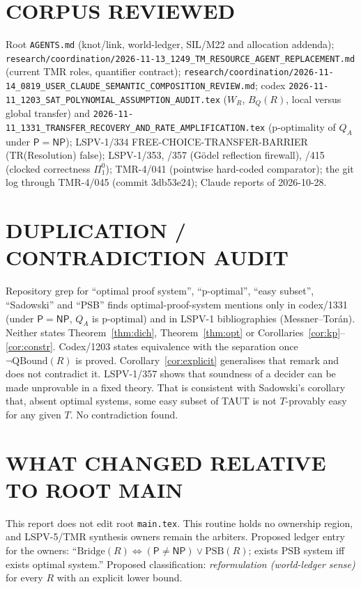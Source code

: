 \documentclass[11pt]{article}
\theoremstyle{definition}
\newcommand{\Pc}{\mathsf{P}}
\newcommand{\NP}{\mathsf{NP}}
\newcommand{\PSB}{\mathrm{PSB}}
\newcommand{\Bridge}{\mathrm{Bridge}}
\begin{document}
\section*{CORPUS REVIEWED}
Root \texttt{AGENTS.md} (knot/link, world-ledger, SIL/M22 and allocation
addenda); \texttt{research/coordination/2026-11-13\_1249\_TM\_RESOURCE\_AGENT\_REPLACEMENT.md}
(current TMR roles, quantifier contract);
\texttt{research/coordination/2026-11-14\_0819\_USER\_CLAUDE\_SEMANTIC\_COMPOSITION\_REVIEW.md};
codex \texttt{2026-11-11\_1203\_SAT\_POLYNOMIAL\_ASSUMPTION\_AUDIT.tex}
($W_R$, $B_Q(R)$, local versus global transfer) and
\texttt{2026-11-11\_1331\_TRANSFER\_RECOVERY\_AND\_RATE\_AMPLIFICATION.tex}
(p-optimality of $Q_A$ under $\Pc=\NP$); LSPV-1/334 FREE-CHOICE-TRANSFER-BARRIER
(TR(Resolution) false); LSPV-1/353, /357 (Gödel reflection firewall), /415
(clocked correctness $\Pi^0_1$); TMR-4/041 (pointwise hard-coded comparator);
the git log through TMR-4/045 (commit 3db53e24); Claude reports of 2026-10-28.

\section*{DUPLICATION / CONTRADICTION AUDIT}
Repository grep for ``optimal proof system'', ``p-optimal'', ``easy subset'',
``Sadowski'' and ``PSB'' finds optimal-proof-system mentions only in codex/1331
(under $\Pc=\NP$, $Q_A$ is p-optimal) and in LSPV-1 bibliographies
(Messner--Torán). Neither states Theorem~\ref{thm:dich},
Theorem~\ref{thm:opt} or Corollaries~\ref{cor:kp}--\ref{cor:constr}.
Codex/1203 states equivalence with the separation once
$\neg\mathrm{QBound}(R)$ is proved. Corollary~\ref{cor:explicit} generalises
that remark and does not contradict it. LSPV-1/357 shows that soundness of a
decider can be made unprovable in a fixed theory. That is consistent with
Sadowski's corollary that, absent optimal systems, some easy subset of TAUT is
not $T$-provably easy for any given $T$. No contradiction found.

\section*{WHAT CHANGED RELATIVE TO ROOT MAIN}
This report does not edit root \texttt{main.tex}. This routine holds no
ownership region, and LSPV-5/TMR synthesis owners remain the arbiters. Proposed
ledger entry for the owners: ``$\Bridge(R)\iff(\Pc\ne\NP)\vee\PSB(R)$; exists
$\PSB$ system iff exists optimal system.'' Proposed classification:
\emph{reformulation (world-ledger sense)} for every $R$ with an explicit lower
bound.
\end{document}
